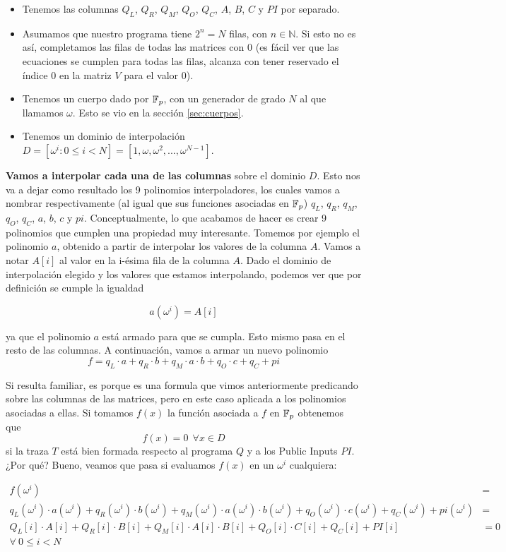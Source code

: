 \begin{itemize}
    \item Tenemos las columnas $Q_L$, $Q_R$, $Q_M$, $Q_O$, $Q_C$, $A$, $B$, $C$ y $PI$ por separado. 
    \item Asumamos que nuestro programa tiene $2^n = N$ filas, con $n \in \mathbb{N}$. Si esto no es así, completamos las filas de todas las matrices con $0$ (es fácil ver que las ecuaciones se cumplen para todas las filas, alcanza con tener reservado el índice $0$ en la matriz $V$ para el valor $0$).
    \item Tenemos un cuerpo dado por $\mathbb{F}_p$, con un generador de grado $N$ al que llamamos $\omega$. Esto se vio en la sección \ref{sec:cuerpos}.
    \item Tenemos un dominio de interpolación $D=[\omega^i : 0 \leq i < N] = [1, \omega, \omega^2, ..., \omega^{N-1}]$.
\end{itemize}

\textbf{Vamos a interpolar cada una de las columnas} sobre el dominio $D$. Esto nos va a dejar como resultado los 9 polinomios interpoladores, los cuales vamos a nombrar respectivamente (al igual que sus funciones asociadas en $\mathbb{F}_p$) $q_L$, $q_R$, $q_M$, $q_O$, $q_C$, $a$, $b$, $c$ y $pi$. Conceptualmente, lo que acabamos de hacer es crear 9 polinomios que cumplen una propiedad muy interesante. Tomemos por ejemplo el polinomio $a$, obtenido a partir de interpolar los valores de la columna $A$. Vamos a notar $A[i]$ al valor en la i-ésima fila de la columna $A$. Dado el dominio de interpolación elegido y los valores que estamos interpolando, podemos ver que por definición se cumple la igualdad

$$a(\omega^i) = A[i]$$

ya que el polinomio $a$ está armado para que se cumpla. Esto mismo pasa en el resto de las columnas. A continuación, vamos a armar un nuevo polinomio 
$$f = q_L \cdot a + q_R \cdot b + q_M \cdot a \cdot b + q_O \cdot c + q_C + pi$$

Si resulta familiar, es porque es una formula que vimos anteriormente predicando sobre las columnas de las matrices, pero en este caso aplicada a los polinomios asociadas a ellas. Si tomamos $f(x)$ la función asociada a $f$ en $\mathbb{F}_p$ obtenemos que 
$$f(x) = 0 ~~ \forall x \in D$$
si la traza $T$ está bien formada respecto al programa $Q$ y a los Public Inputs $PI$. ¿Por qué? Bueno, veamos que pasa si evaluamos $f(x)$ en un $\omega^i$ cualquiera:

\begin{align*}
f(\omega^i) &= \\
q_L(\omega^i) \cdot a(\omega^i) + q_R(\omega^i) \cdot b(\omega^i) + q_M(\omega^i) \cdot a(\omega^i) \cdot b(\omega^i) + q_O(\omega^i) \cdot c(\omega^i) + q_C(\omega^i) + pi(\omega^i)&= \\
Q_L[i] \cdot A[i] + Q_R[i] \cdot B[i] + Q_M[i] \cdot A[i] \cdot B[i] + Q_O[i] \cdot C[i] + Q_C[i] + PI[i] &= 0\\
\forall ~0 \leq i < N
\end{align*}

